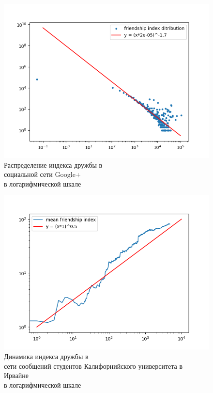 \documentclass[bachelor, och, diploma]{SCWorks}
\begin{document}
\begin{figure}[!ht]
    \centering
    \includegraphics[scale=0.5]{diploma_results/static_real_log/gplus_combined.png}
    \caption{Распределение индекса дружбы  в\\ социальной сети Google+\\ в логарифмической шкале}
\end{figure}
\begin{figure}[!ht]
    \centering
    \includegraphics[scale=0.5]{diploma_results/dynamic_real_log/CollegeMsg_mean.png}
    \caption{Динамика индекса дружбы  в\\ сети сообщений студентов Калифорнийского университета в Ирвайне\\ в логарифмической шкале}
\end{figure}
\end{document}
